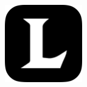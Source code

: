 \documentclass[a0]{a0poster}
\begin{document}
\begin{textblock}{7.0}
\begin{multicols}{2}
\begin{itemize}
    \vspace{50pt}

    \begin{figure}[!h]
      \centering
      \includegraphics[width=0.30\textwidth]{lol-icon.pdf}
      \label{fig:lol}
    \end{figure}

  \end{itemize}
\end{multicols}

\end{textblock}
\end{document}
